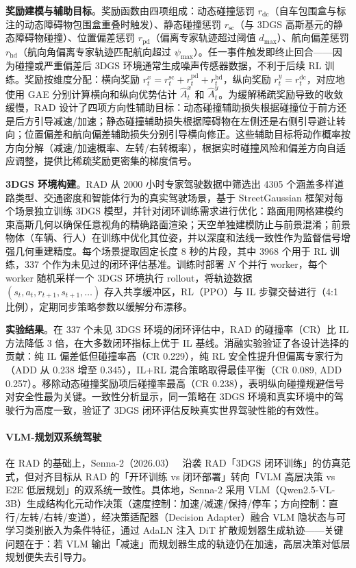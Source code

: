 \textbf{奖励建模与辅助目标}。奖励函数由四项组成：动态碰撞惩罚 $r_{\text{dc}}$（自车包围盒与标注的动态障碍物包围盒重叠时触发）、静态碰撞惩罚 $r_{\text{sc}}$（与 3DGS 高斯基元的静态障碍物碰撞）、位置偏差惩罚 $r_{\text{pd}}$（偏离专家轨迹超过阈值 $d_{\max}$）、航向偏差惩罚 $r_{\text{hd}}$（航向角偏离专家轨迹匹配航向超过 $\psi_{\max}$）。任一事件触发即终止回合——因为碰撞或严重偏差后 3DGS 环境通常生成噪声传感器数据，不利于后续 RL 训练。奖励按维度分配：横向奖励 $r_t^x = r_t^{\text{sc}} + r_t^{\text{pd}} + r_t^{\text{hd}}$，纵向奖励 $r_t^y = r_t^{\text{dc}}$，对应地使用 GAE 分别计算横向和纵向优势估计 $\hat{A}_t^x$ 和 $\hat{A}_t^y$。为缓解稀疏奖励导致的收敛缓慢，RAD 设计了四项方向性辅助目标：动态碰撞辅助损失根据碰撞位于前方还是后方引导减速/加速；静态碰撞辅助损失根据障碍物在左侧还是右侧引导避让转向；位置偏差和航向偏差辅助损失分别引导横向修正。这些辅助目标将动作概率按方向分解（减速/加速概率、左转/右转概率），根据实时碰撞风险和偏差方向自适应调整，提供比稀疏奖励更密集的梯度信号。

\textbf{3DGS 环境构建}。RAD 从 2000 小时专家驾驶数据中筛选出 4305 个涵盖多样道路类型、交通密度和智能体行为的真实驾驶场景，基于 StreetGaussian 框架对每个场景独立训练 3DGS 模型，并针对闭环训练需求进行优化：路面用网格建模约束高斯几何以确保任意视角的精确路面渲染；天空单独建模防止与前景混淆；前景物体（车辆、行人）在训练中优化其位姿，并以深度和法线一致性作为监督信号增强几何重建精度。每个场景提取固定长度 8 秒的片段，其中 3968 个用于 RL 训练，337 个作为未见过的闭环评估基准。训练时部署 $N$ 个并行 worker，每个 worker 随机采样一个 3DGS 环境执行 rollout，将轨迹数据 $(s_t, a_t, r_{t+1}, s_{t+1}, \ldots)$ 存入共享缓冲区，RL（PPO）与 IL 步骤交替进行（4:1 比例），定期同步策略参数以缓解分布漂移。

\textbf{实验结果}。在 337 个未见 3DGS 环境的闭环评估中，RAD 的碰撞率（CR）比 IL 方法降低 3 倍，在大多数闭环指标上优于 IL 基线。消融实验验证了各设计选择的贡献：纯 IL 偏差低但碰撞率高（CR 0.229），纯 RL 安全性提升但偏离专家行为（ADD 从 0.238 增至 0.345），IL+RL 混合策略取得最佳平衡（CR 0.089, ADD 0.257）。移除动态碰撞奖励项后碰撞率最高（CR 0.238），表明纵向碰撞规避信号对安全性最为关键。一致性分析显示，同一策略在 3DGS 环境和真实环境中的驾驶行为高度一致，验证了 3DGS 闭环评估反映真实世界驾驶性能的有效性。

\paragraph{VLM-规划双系统驾驶}

在 RAD 的基础上，Senna-2（2026.03）~\cite{2603_11219} 沿袭 RAD「3DGS 闭环训练」的仿真范式，但对齐目标从 RAD 的「开环训练 vs 闭环部署」转向「VLM 高层决策 vs E2E 低层规划」的双系统一致性。具体地，Senna-2 采用 VLM（Qwen2.5-VL-3B）生成结构化元动作决策（速度控制：加速/减速/保持/停车；方向控制：直行/左转/右转/变道），经决策适配器（Decision Adapter）融合 VLM 隐状态与可学习类别嵌入为条件特征，通过 AdaLN 注入 DiT 扩散规划器生成轨迹——关键问题在于：若 VLM 输出「减速」而规划器生成的轨迹仍在加速，高层决策对低层规划便失去引导力。

